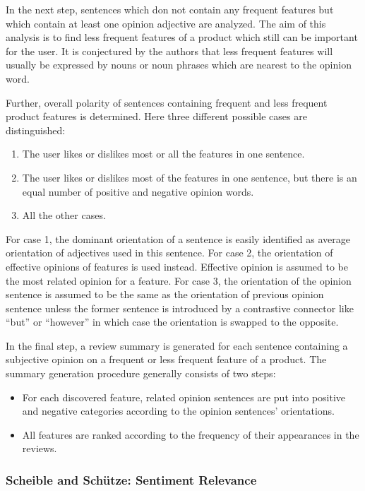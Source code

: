 \documentclass[a4paper,11pt]{article}
\begin{document}
In the next step, sentences which don not contain any frequent features but
which contain at least one opinion adjective are analyzed.  The aim of this
analysis is to find less frequent features of a product which still can be
important for the user.  It is conjectured by the authors that less frequent
features will usually be expressed by nouns or noun phrases which are nearest
to the opinion word.

Further, overall polarity of sentences containing frequent and less frequent
product features is determined.  Here three different possible cases are
distinguished:
\begin{enumerate}
  \item The user likes or dislikes most or all the features in one sentence.
  \item The user likes or dislikes most of the features in one sentence, but
    there is an equal number of positive and negative opinion words.
  \item All the other cases.
\end{enumerate}
For case 1, the dominant orientation of a sentence is easily identified as
average orientation of adjectives used in this sentence.  For case 2, the
orientation of effective opinions of features is used instead.  Effective
opinion is assumed to be the most related opinion for a feature.  For case 3,
the orientation of the opinion sentence is assumed to be the same as the
orientation of previous opinion sentence unless the former sentence is
introduced by a contrastive connector like ``but'' or ``however'' in which
case the orientation is swapped to the opposite.

In the final step, a review summary is generated for each sentence containing
a subjective opinion on a frequent or less frequent feature of a product.  The
summary generation procedure generally consists of two steps:
\begin{itemize}
  \item For each discovered feature, related opinion sentences are put into
    positive and negative categories according to the opinion sentences'
    orientations.

  \item All features are ranked according to the frequency of their
    appearances in the reviews.
\end{itemize}

\subsubsection{Scheible and Sch\"utze: Sentiment Relevance\cite{Scheible-13}}
\end{document}
